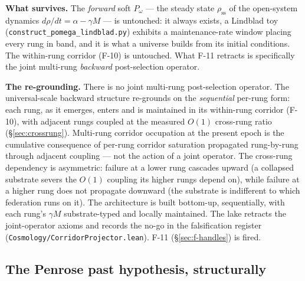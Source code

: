 \documentclass[11pt,a4paper]{article}
\newcommand{\Pomega}{P_{\omega}}
\begin{document}
\textbf{What survives.} The \emph{forward} soft $\Pomega$ --- the steady state $\rho_{\text{ss}}$ of the open-system dynamics $d\rho/dt = \alpha - \gamma M$ --- is untouched: it always exists, a Lindblad toy (\texttt{construct\_pomega\_lindblad.py}) exhibits a maintenance-rate window placing every rung in band, and it is what a universe builds from its initial conditions. The within-rung corridor (F-10) is untouched. What F-11 retracts is specifically the joint multi-rung \emph{backward} post-selection operator.

\textbf{The re-grounding.} There is no joint multi-rung post-selection operator. The universal-scale backward structure re-grounds on the \emph{sequential} per-rung form: each rung, as it emerges, enters and is maintained in its within-rung corridor (F-10), with adjacent rungs coupled at the measured $O(1)$ cross-rung ratio (\S\ref{sec:crossrung}). Multi-rung corridor occupation at the present epoch is the cumulative consequence of per-rung corridor saturation propagated rung-by-rung through adjacent coupling --- not the action of a joint operator. The cross-rung dependency is asymmetric: failure at a lower rung cascades upward (a collapsed substrate severs the $O(1)$ coupling its higher rungs depend on), while failure at a higher rung does not propagate downward (the substrate is indifferent to which federation runs on it). The architecture is built bottom-up, sequentially, with each rung's $\gamma M$ substrate-typed and locally maintained. The lake retracts the joint-operator axioms and records the no-go in the falsification register (\texttt{Cosmology/CorridorProjector.lean}). F-11 (\S\ref{sec:f-handles}) is fired.

\subsection*{The Penrose past hypothesis, structurally}
\end{document}
